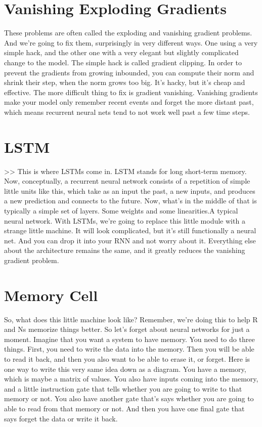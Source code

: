 \documentclass{article}
\begin{document}
\section{Vanishing  Exploding Gradients}
These problems are often
called the exploding and
vanishing gradient problems.
And we're going to fix them,
surprisingly in very different ways.
One using a very simple hack, and
the other one with a very elegant but
slightly complicated
change to the model.
The simple hack is called
gradient clipping.
In order to prevent the gradients
from growing inbounded,
you can compute their norm and shrink
their step, when the norm grows too big.
It's hacky, but
it's cheap and effective.
The more difficult thing to
fix is gradient vanishing.
Vanishing gradients make your model
only remember recent events and
forget the more distant past,
which means recurrent neural nets tend
to not work well past a few time steps.
\section{LSTM}
>> This is where LSTMs come in.
LSTM stands for long short-term memory.
Now, conceptually, a recurrent neural
network consists of a repetition of
simple little units like this,
which take as an input the past,
a new inputs, and produces a new
prediction and connects to the future.
Now, what's in the middle of that is
typically a simple set of layers.
Some weights and some linearities.A
typical neural network.
With LSTMs,
we're going to replace this little
module with a strange little machine.
It will look complicated, but
it's still functionally a neural net.
And you can drop it into your RNN and
not worry about it.
Everything else about the architecture
remains the same, and
it greatly reduces
the vanishing gradient problem.
\section{Memory Cell}
So, what does this little
machine look like?
Remember, we're doing this to help R and
Ns memorize things better.
So let's forget about neural
networks for just a moment.
Imagine that you want
a system to have memory.
You need to do three things.
First, you need to write
the data into the memory.
Then you will be able to read it back,
and
then you also want to be
able to erase it, or forget.
Here is one way to write this
very same idea down as a diagram.
You have a memory,
which is maybe a matrix of values.
You also have inputs coming into
the memory, and a little instruction
gate that tells whether you are going
to write to that memory or not.
You also have another gate that's
says whether you are going to able
to read from that memory or not.
And then you have one final gate that
says forget the data or write it back.
\end{document}
